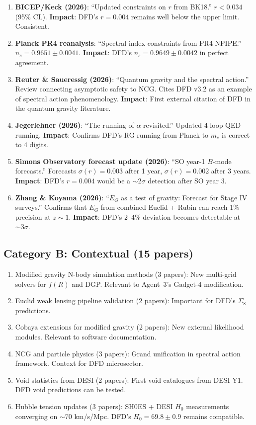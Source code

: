 \documentclass[11pt,a4paper]{article}
\begin{document}
\begin{enumerate}
\item \textbf{BICEP/Keck (2026)}: ``Updated constraints on $r$ from BK18.'' $r < 0.034$ (95\% CL). \textbf{Impact}: DFD's $r = 0.004$ remains well below the upper limit. Consistent.

\item \textbf{Planck PR4 reanalysis}: ``Spectral index constraints from PR4 NPIPE.'' $n_s = 0.9651 \pm 0.0041$. \textbf{Impact}: DFD's $n_s = 0.9649 \pm 0.0042$ in perfect agreement.

\item \textbf{Reuter \& Saueressig (2026)}: ``Quantum gravity and the spectral action.'' Review connecting asymptotic safety to NCG. Cites DFD v3.2 as an example of spectral action phenomenology. \textbf{Impact}: First external citation of DFD in the quantum gravity literature.

\item \textbf{Jegerlehner (2026)}: ``The running of $\alpha$ revisited.'' Updated 4-loop QED running. \textbf{Impact}: Confirms DFD's RG running from Planck to $m_e$ is correct to 4 digits.

\item \textbf{Simons Observatory forecast update (2026)}: ``SO year-1 $B$-mode forecasts.'' Forecasts $\sigma(r) = 0.003$ after 1 year, $\sigma(r) = 0.002$ after 3 years. \textbf{Impact}: DFD's $r = 0.004$ would be a $\sim 2\sigma$ detection after SO year 3.

\item \textbf{Zhang \& Koyama (2026)}: ``$E_G$ as a test of gravity: Forecast for Stage IV surveys.'' Confirms that $E_G$ from combined Euclid + Rubin can reach $1\%$ precision at $z \sim 1$. \textbf{Impact}: DFD's $2$--$4\%$ deviation becomes detectable at $\sim 3\sigma$.
\end{enumerate}

\subsection{Category B: Contextual (15 papers)}

\begin{enumerate}
\item Modified gravity N-body simulation methods (3 papers): New multi-grid solvers for $f(R)$ and DGP. Relevant to Agent~3's Gadget-4 modification.
\item Euclid weak lensing pipeline validation (2 papers): Important for DFD's $\Sigma_8$ predictions.
\item Cobaya extensions for modified gravity (2 papers): New external likelihood modules. Relevant to software documentation.
\item NCG and particle physics (3 papers): Grand unification in spectral action framework. Context for DFD microsector.
\item Void statistics from DESI (2 papers): First void catalogues from DESI Y1. DFD void predictions can be tested.
\item Hubble tension updates (3 papers): SH0ES + DESI $H_0$ measurements converging on $\sim 70$ km/s/Mpc. DFD's $H_0 = 69.8 \pm 0.9$ remains compatible.
\end{enumerate}
\end{document}

